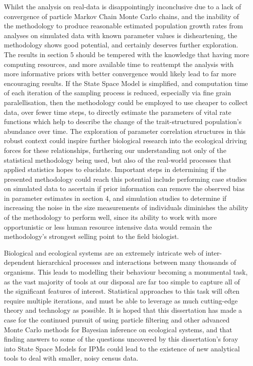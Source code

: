 \documentclass[a4paper,12pt]{article}
\begin{document}
Whilst the analysis on real-data is disappointingly inconclusive due to a lack of convergence of particle Markov Chain Monte Carlo chains, and the inability of the methodology to produce reasonable estimated population growth rates from analyses on simulated data with known parameter values is disheartening, the methodology shows good potential, and certainly deserves further exploration. The results in section 5 should be tempered with the knowledge that having more computing resources, and more available time to reattempt the analysis with more informative priors with better convergence would likely lead to far more encouraging results. If the State Space Model is simplified, and computation time of each iteration of the sampling process is reduced, especially via fine grain paralellisation, then the methodology could be employed to use cheaper to collect data, over fewer time steps, to directly estimate the parameters of vital rate functions which help to describe the change of the trait-structured population's abundance over time. The exploration of parameter correlation structures in this robust context could inspire further biological research into the ecological driving forces for these relationships, furthering our understanding not only of the statistical methodology being used, but also of the real-world processes that applied statistics hopes to elucidate. Important steps in determining if the presented methodology could reach this potential include performing case studies on simulated data to ascertain if prior information can remove the observed bias in parameter estimates in section 4, and simulation studies to determine if increasing the noise in the size measurements of individuals diminishes the ability of the methodology to perform well, since its ability to work with more opportunistic or less human resource intensive data would remain the methodology's strongest selling point to the field biologist.

Biological and ecological systems are an extremely intricate web of inter-dependent hierarchical processes and interactions between many thousands of organisms. This leads to modelling their behaviour becoming a monumental task, as the vast majority of tools at our disposal are far too simple to capture all of the significant features of interest. Statistical approaches to this task will often require multiple iterations, and must be able to leverage as much cutting-edge theory and technology as possible. It is hoped that this dissertation has made a case for the continued pursuit of using particle filtering and other advanced Monte Carlo methods for Bayesian inference on ecological systems, and that finding answers to some of the questions uncovered by this dissertation's foray into State Space Models for IPMs could lead to the existence of new analytical tools to deal with smaller, noisy census data.

\clearpage


\end{document}

